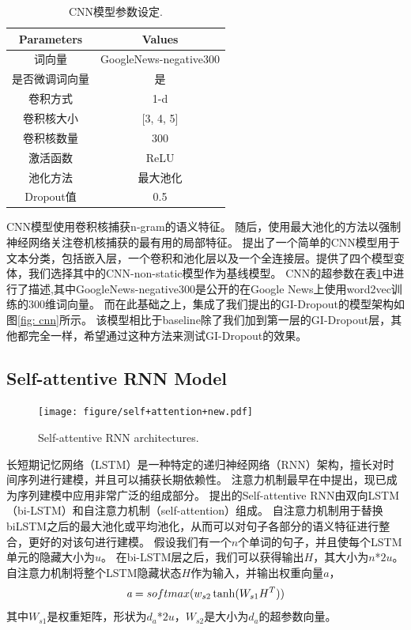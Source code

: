 \begin{table}[!t]
\centering
\begin{tabular}{c c}
\hline
\bfseries Parameters & \bfseries Values\\
\hline
词向量 & GoogleNews-negative300 \\
是否微调词向量 & 是\\
卷积方式 & 1-d \\
卷积核大小 & [3, 4, 5] \\
卷积核数量 & 300 \\
激活函数 & ReLU \\
池化方法 & 最大池化 \\
Dropout值 & 0.5 \\
\hline
\end{tabular}
\caption{CNN模型参数设定.}
\label{table: baseline hyperparameters}
\end{table}

CNN模型使用卷积核捕获n-gram的语义特征。
随后，使用最大池化的方法以强制神经网络关注卷机核捕获的最有用的局部特征\cite{collobert2011natural}。
提出了一个简单的CNN模型用于文本分类，包括嵌入层，一个卷积和池化层以及一个全连接层。提供了四个模型变体，我们选择其中的CNN-non-static模型作为基线模型。
CNN的超参数在表\ref{table: baseline hyperparameters}中进行了描述,其中GoogleNews-negative300是公开的在Google News上使用word2vec\cite{mikolov2013distributed}训练的300维词向量。
而在此基础之上，集成了我们提出的GI-Dropout的模型架构如图\ref{fig: cnn}所示。
该模型相比于baseline除了我们加到第一层的GI-Dropout层，其他都完全一样，希望通过这种方法来测试GI-Dropout的效果。

\subsection{Self-attentive RNN Model}
\begin{figure}[!t]
\centering
  \texttt{[image: figure/self+attention+new.pdf]}
  \caption{Self-attentive RNN architectures.}
  \label{fig: rnn}
\end{figure}

长短期记忆网络（LSTM）是一种特定的递归神经网络（RNN）架构，擅长对时间序列进行建模，并且可以捕获长期依赖性\citep{sak2014long}。
注意力机制最早在\citep{bahdanau2014neural}中提出，现已成为序列建模中应用非常广泛的组成部分。
\cite{lin2017structured}提出的Self-attentive RNN由双向LSTM（bi-LSTM）和自注意力机制（self-attention）组成。
自注意力机制用于替换biLSTM之后的最大池化或平均池化，从而可以对句子各部分的语义特征进行整合，更好的对该句进行建模。
假设我们有一个$n$个单词的句子，并且使每个LSTM单元的隐藏大小为$u$。
在bi-LSTM层之后，我们可以获得输出$H$，其大小为$n$*$2u$。
自注意力机制将整个LSTM隐藏状态$H$作为输入，并输出权重向量$a$，
\begin{equation}
\emph{a} = softmax(w_{s2}\tanh(W_{s1}H^T))
\end{equation}
其中$W_{s1}$是权重矩阵，形状为$d_{a}$*$2u$，$W_{s2}$是大小为$d_{a}$的超参数向量。

